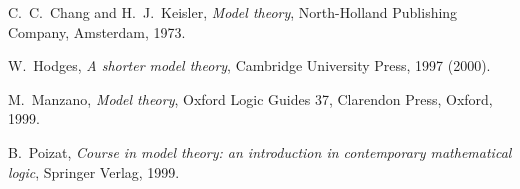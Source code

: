 \documentclass[12pt]{article}
\begin{document}
\begin{thebibliography}{99}
  C.~C.~Chang and H.~J.~Keisler, {\it Model theory}, North-Holland Publishing Company, Amsterdam, 1973.

  W.~Hodges, {\it A shorter model theory}, Cambridge University Press, 1997 (2000).

  M.~Manzano, {\it Model theory}, Oxford Logic Guides 37, Clarendon Press, Oxford, 1999.

  B.~Poizat, {\it Course in model theory: an introduction in contemporary mathematical logic}, Springer Verlag, 1999.
\end{thebibliography}

\end{document}
